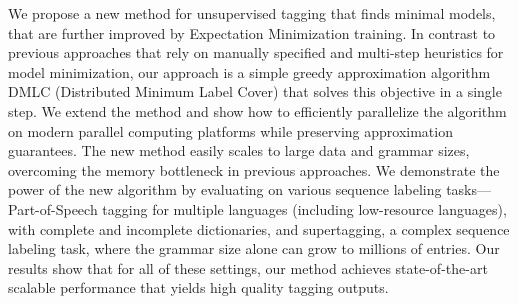 We propose a new method for unsupervised tagging that finds minimal models, that are further improved by Expectation Minimization training. In contrast to previous approaches that rely on manually specified and multi-step heuristics for model minimization, our approach is a simple greedy approximation algorithm DMLC (Distributed Minimum Label Cover) that solves this objective in a single step. We extend the method and show how to efficiently parallelize the algorithm on modern parallel computing platforms while preserving approximation guarantees. The new method easily scales to large data and grammar sizes, overcoming the memory bottleneck in previous approaches. We demonstrate the power of the new algorithm by evaluating on various sequence labeling tasks---Part-of-Speech tagging for multiple languages (including low-resource languages), with complete and incomplete dictionaries, and supertagging, a complex sequence labeling task, where the grammar size alone can grow to millions of entries. Our results show that for all of these settings, our method achieves state-of-the-art scalable performance that yields high quality tagging outputs.
